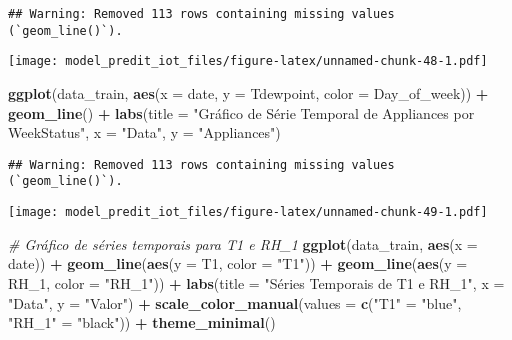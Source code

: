 \documentclass[
]{article}
\newenvironment{Shaded}{\begin{snugshade}}{\end{snugshade}}
\newcommand{\AttributeTok}[1]{\textcolor[rgb]{0.13,0.29,0.53}{#1}}
\newcommand{\CommentTok}[1]{\textcolor[rgb]{0.56,0.35,0.01}{\textit{#1}}}
\newcommand{\FunctionTok}[1]{\textcolor[rgb]{0.13,0.29,0.53}{\textbf{#1}}}
\newcommand{\NormalTok}[1]{#1}
\newcommand{\OtherTok}[1]{\textcolor[rgb]{0.56,0.35,0.01}{#1}}
\newcommand{\SpecialCharTok}[1]{\textcolor[rgb]{0.81,0.36,0.00}{\textbf{#1}}}
\newcommand{\StringTok}[1]{\textcolor[rgb]{0.31,0.60,0.02}{#1}}
\begin{document}
\begin{verbatim}
## Warning: Removed 113 rows containing missing values (`geom_line()`).
\end{verbatim}

\texttt{[image: model\_predit\_iot\_files/figure-latex/unnamed-chunk-48-1.pdf]}

\begin{Shaded}
\begin{Highlighting}[]
\FunctionTok{ggplot}\NormalTok{(data\_train, }\FunctionTok{aes}\NormalTok{(}\AttributeTok{x =}\NormalTok{ date, }\AttributeTok{y =}\NormalTok{ Tdewpoint, }\AttributeTok{color =}\NormalTok{ Day\_of\_week)) }\SpecialCharTok{+}
  \FunctionTok{geom\_line}\NormalTok{() }\SpecialCharTok{+}
  \FunctionTok{labs}\NormalTok{(}\AttributeTok{title =} \StringTok{"Gráfico de Série Temporal de Appliances por WeekStatus"}\NormalTok{,}
       \AttributeTok{x =} \StringTok{"Data"}\NormalTok{,}
       \AttributeTok{y =} \StringTok{"Appliances"}\NormalTok{)}
\end{Highlighting}
\end{Shaded}

\begin{verbatim}
## Warning: Removed 113 rows containing missing values (`geom_line()`).
\end{verbatim}

\texttt{[image: model\_predit\_iot\_files/figure-latex/unnamed-chunk-49-1.pdf]}

\begin{Shaded}
\begin{Highlighting}[]
\CommentTok{\# Gráfico de séries temporais para T1 e RH\_1}
\FunctionTok{ggplot}\NormalTok{(data\_train, }\FunctionTok{aes}\NormalTok{(}\AttributeTok{x =}\NormalTok{ date)) }\SpecialCharTok{+}
  \FunctionTok{geom\_line}\NormalTok{(}\FunctionTok{aes}\NormalTok{(}\AttributeTok{y =}\NormalTok{ T1, }\AttributeTok{color =} \StringTok{"T1"}\NormalTok{)) }\SpecialCharTok{+}
  \FunctionTok{geom\_line}\NormalTok{(}\FunctionTok{aes}\NormalTok{(}\AttributeTok{y =}\NormalTok{ RH\_1, }\AttributeTok{color =} \StringTok{"RH\_1"}\NormalTok{)) }\SpecialCharTok{+}
  \FunctionTok{labs}\NormalTok{(}\AttributeTok{title =} \StringTok{"Séries Temporais de T1 e RH\_1"}\NormalTok{,}
       \AttributeTok{x =} \StringTok{"Data"}\NormalTok{,}
       \AttributeTok{y =} \StringTok{"Valor"}\NormalTok{) }\SpecialCharTok{+}
  \FunctionTok{scale\_color\_manual}\NormalTok{(}\AttributeTok{values =} \FunctionTok{c}\NormalTok{(}\StringTok{"T1"} \OtherTok{=} \StringTok{"blue"}\NormalTok{, }\StringTok{"RH\_1"} \OtherTok{=} \StringTok{"black"}\NormalTok{)) }\SpecialCharTok{+}
  \FunctionTok{theme\_minimal}\NormalTok{()}
\end{Highlighting}
\end{Shaded}
\end{document}
